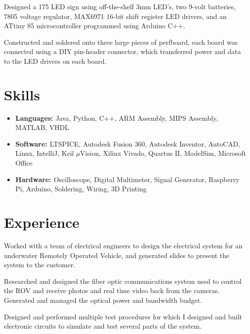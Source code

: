 \documentclass[letter]{comcv}
\begin{document}

    \begin{tightlist}
        \item Designed a 175 LED sign using off-the-shelf 3mm LED's, two 9-volt batteries, 7805 voltage regulator, MAX6971 16-bit shift register LED drivers, and an ATtiny 85 microcontroller programmed using Arduino C++.
        \item Constructed and soldered onto three large pieces of perfboard, each board was connected using a DIY pin-header connector, which transferred power and data to the LED drivers on each board.
    \end{tightlist}


\section{Skills}
\begin{itemize}
    \item {\bf{Languages: }}  {Java, Python, C++, ARM Assembly, MIPS Assembly, MATLAB, VHDL} 
    
    \item {\bf{Software: }} {LTSPICE, Autodesk Fusion 360, Autodesk Inventor, AutoCAD, Linux, IntelliJ, Keil $\mu$Vision, Xilinx Vivado, Quartus II, ModelSim, Microsoft Office}
    
    \item {\bf{Hardware: }}  {Oscilloscope, Digital Multimeter, Signal Generator, Raspberry Pi, Arduino, Soldering, Wiring, 3D Printing}
\end{itemize}


\section{Experience}

    \begin{tightlist}
    \item Worked with a team of electrical engineers to design the electrical system for an underwater Remotely Operated Vehicle, and generated slides to present the system to the customer.
    \item Researched and designed the fiber optic communications system used to control the ROV and receive photos and real time video back from the cameras. Generated and managed the optical power and bandwidth budget.
    \item Designed and performed multiple test procedures for which I designed and built electronic circuits to simulate and test several parts of the system.
    \end{tightlist}
\end{document}
